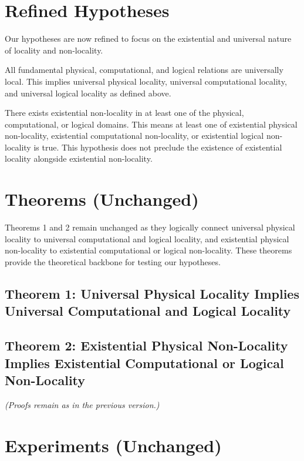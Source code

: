 \section{Refined Hypotheses}

Our hypotheses are now refined to focus on the existential and universal nature of locality and non-locality.

\begin{hypothesis}
	All fundamental physical, computational, and logical relations are universally local.  This implies universal physical locality, universal computational locality, and universal logical locality as defined above.
\end{hypothesis}

\begin{hypothesis}
	There exists existential non-locality in at least one of the physical, computational, or logical domains.  This means at least one of existential physical non-locality, existential computational non-locality, or existential logical non-locality is true.  This hypothesis does not preclude the existence of existential locality alongside existential non-locality.
\end{hypothesis}

\section{Theorems (Unchanged)}

Theorems 1 and 2 remain unchanged as they logically connect universal physical locality to universal computational and logical locality, and existential physical non-locality to existential computational or logical non-locality.  These theorems provide the theoretical backbone for testing our hypotheses.

\subsection{Theorem 1: Universal Physical Locality Implies Universal Computational and Logical Locality}
\subsection{Theorem 2: Existential Physical Non-Locality Implies Existential Computational or Logical Non-Locality}
\textit{(Proofs remain as in the previous version.)}

\section{Experiments (Unchanged)}

